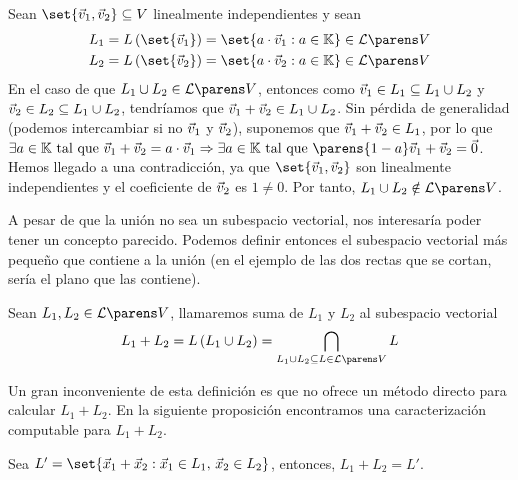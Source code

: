 \documentclass[../algebra_lineal.tex]{subfiles}
\begin{document}
\begin{example}
    Sean $\set{\vv_1, \vv_2} \subseteq V$ linealmente independientes y sean
    \begin{align*}
        L_1 = \lspan{\set{\vv_1}} &= \set{a \cdot \vv_1 : a \in \K } \in \subespaciosde{V} \\
        L_2 = \lspan{\set{\vv_2}} &= \set{a \cdot \vv_2 : a \in \K } \in \subespaciosde{V}
    \end{align*}
    En el caso de que $L_1 \cup L_2 \in \subespaciosde{V}$, entonces como $\vec{v}_1 \in L_1 \subseteq L_1 \cup L_2$ y $\vec{v}_2 \in L_2 \subseteq L_1 \cup L_2$, tendríamos que $\vec{v}_1 + \vec{v}_2 \in L_1 \cup L_2$. Sin pérdida de generalidad (podemos intercambiar si no $\vec{v}_1$ y $\vec{v}_2$), suponemos que $\vec{v}_1 + \vec{v}_2 \in L_1$, por lo que $\exists a \in \K \st \vv_1 + \vv_2 = a \cdot \vv_1 \Rightarrow \exists a \in \K \st \parens{1-a}\vv_1 + \vv_2 = \zv$. Hemos llegado a una contradicción, ya que $\set{\vv_1, \vv_2}$ son linealmente independientes y el coeficiente de $\vec{v}_2$ es $1 \ne 0$. Por tanto, $L_1 \cup L_2 \notin \subespaciosde{V}$. 
\end{example}

A pesar de que la unión no sea un subespacio vectorial, nos interesaría poder tener un concepto parecido. Podemos definir entonces el subespacio vectorial más pequeño que contiene a la unión (en el ejemplo de las dos rectas que se cortan, sería el plano que las contiene). 

\begin{definition}[Suma]
    Sean $L_1, L_2 \in \subespaciosde{V}$, llamaremos suma de $L_1$ y $L_2$ al subespacio vectorial 
    \[
        L_1 + L_2 = \lspan{L_1 \cup L_2} = \bigcap_{L_1 \cup L_2 \subseteq L \in \subespaciosde{V}}L
    \]
\end{definition}

Un gran inconveniente de esta definición es que no ofrece un método directo para calcular $L_1 + L_2$. En la siguiente proposición encontramos una caracterización computable para $L_1 + L_2$.

\begin{proposition}
    Sea $L' = \set{\vx_1 + \vx_2 : \vx_1 \in L_1, \, \vx_2 \in L_2}$, entonces, $L_1 + L_2 = L'$.
\end{proposition}
\end{document}
